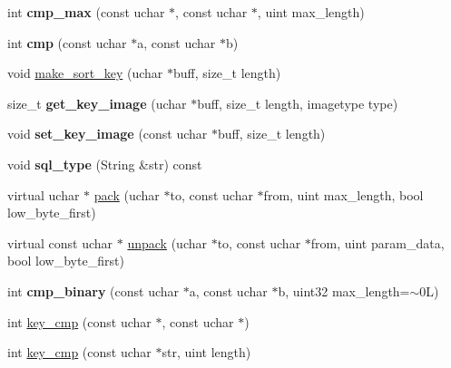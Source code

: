 \begin{DoxyCompactItemize}
\mbox{\label{classField__varstring_a4e9e7076a054b351a5802f1b734f6c11}} 
int {\bfseries cmp\+\_\+max} (const uchar $\ast$, const uchar $\ast$, uint max\+\_\+length)
\item 
\mbox{\label{classField__varstring_a02c0e00df8c3cf3f606711a9bd43b8ba}} 
int {\bfseries cmp} (const uchar $\ast$a, const uchar $\ast$b)
\item 
void \mbox{\hyperlink{classField__varstring_a81d36d340a833e387cea487a157a5762}{make\+\_\+sort\+\_\+key}} (uchar $\ast$buff, size\+\_\+t length)
\item 
\mbox{\label{classField__varstring_a2dc6d759011df00b1ff1f886bc6c14b1}} 
size\+\_\+t {\bfseries get\+\_\+key\+\_\+image} (uchar $\ast$buff, size\+\_\+t length, imagetype type)
\item 
\mbox{\label{classField__varstring_a843fcf3a60e8c22c6fcb093f8276fd44}} 
void {\bfseries set\+\_\+key\+\_\+image} (const uchar $\ast$buff, size\+\_\+t length)
\item 
\mbox{\label{classField__varstring_a5a3e55ee408421c21b32955f50924673}} 
void {\bfseries sql\+\_\+type} (String \&str) const
\item 
virtual uchar $\ast$ \mbox{\hyperlink{classField__varstring_a4e54b98a33cc68aa2c137a88a317f040}{pack}} (uchar $\ast$to, const uchar $\ast$from, uint max\+\_\+length, bool low\+\_\+byte\+\_\+first)
\item 
virtual const uchar $\ast$ \mbox{\hyperlink{classField__varstring_a2e40451e305ae25227d1aea8af1ee083}{unpack}} (uchar $\ast$to, const uchar $\ast$from, uint param\+\_\+data, bool low\+\_\+byte\+\_\+first)
\item 
\mbox{\label{classField__varstring_a2fc6eeeb8f74cdb433c8f196a9214020}} 
int {\bfseries cmp\+\_\+binary} (const uchar $\ast$a, const uchar $\ast$b, uint32 max\+\_\+length=$\sim$0\+L)
\item 
int \mbox{\hyperlink{classField__varstring_ad9e0c52fe4e88df9951362b98a0885f2}{key\+\_\+cmp}} (const uchar $\ast$, const uchar $\ast$)
\item 
int \mbox{\hyperlink{classField__varstring_a2308fc04011a49463f722e17c1d99a8d}{key\+\_\+cmp}} (const uchar $\ast$str, uint length)

\end{DoxyCompactItemize}
